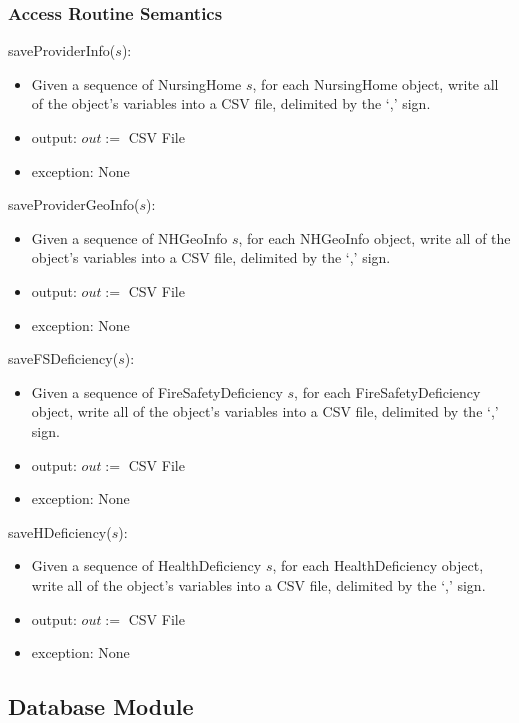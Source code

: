 \documentclass[12pt]{article}
\begin{document}
\subsubsection* {Access Routine Semantics}

\noindent saveProviderInfo($s$):
\begin{itemize}
\item Given a sequence of NursingHome $s$, for each NursingHome object, write all of the object's variables into a CSV file, delimited by the `,' sign. 
\item output: $out :=$ CSV File
\item exception: None
\end{itemize}

\noindent saveProviderGeoInfo($s$):
\begin{itemize}
\item Given a sequence of NHGeoInfo $s$, for each NHGeoInfo object, write all of the object's variables into a CSV file, delimited by the `,' sign. 
\item output: $out :=$ CSV File
\item exception: None
\end{itemize}

\noindent saveFSDeficiency($s$):
\begin{itemize}
\item Given a sequence of FireSafetyDeficiency $s$, for each FireSafetyDeficiency object, write all of the object's variables into a CSV file, delimited by the `,' sign. 
\item output: $out :=$ CSV File
\item exception: None
\end{itemize}

\noindent saveHDeficiency($s$):
\begin{itemize}
\item Given a sequence of HealthDeficiency $s$, for each HealthDeficiency object, write all of the object's variables into a CSV file, delimited by the `,' sign. 
\item output: $out :=$ CSV File
\item exception: None
\end{itemize}

\newpage

\subsection{Database Module}
\end{document}
